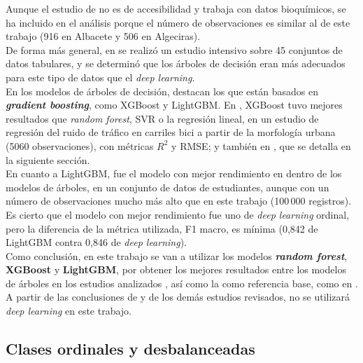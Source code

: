 Aunque el estudio de \textcite{knights2026} no es de accesibilidad y trabaja con datos bioquímicos, se ha incluido en el análisis porque el número de observaciones es similar al de este trabajo (916 en Albacete y 506 en Algeciras).
\\

De forma más general, en \textcite{grinsztajn2022} se realizó un estudio intensivo sobre 45 conjuntos de datos tabulares, y se determinó que los árboles de decisión eran más adecuados para este tipo de datos que el \textit{deep learning}.
\\

En los modelos de árboles de decisión, destacan los que están basados en \textbf{\textit{gradient boosting}}, como XGBoost y LightGBM. En \textcite{wu2026}, XGBoost tuvo mejores resultados que \textit{random forest}, \gls{SVR} o la regresión lineal, en un estudio de regresión del ruido de tráfico en carriles bici a partir de la morfología urbana (5060 observaciones), con métricas $R^2$ y \gls{RMSE}; y también en \textcite{jean2025}, que se detalla en la siguiente sección.
\\

En cuanto a LightGBM, fue el modelo con mejor rendimiento en \textcite{agal2026} dentro de los modelos de árboles, en un conjunto de datos de estudiantes, aunque con un número de observaciones mucho más alto que en este trabajo (100\,000 registros). Es cierto que el modelo con mejor rendimiento fue uno de \textit{deep learning} ordinal, pero la diferencia de la métrica utilizada, F1 macro, es mínima (0,842 de LightGBM contra 0,846 de \textit{deep learning}).
\\

Como conclusión, en este trabajo se van a utilizar los modelos \textbf{\textit{random forest}}, \textbf{XGBoost} y \textbf{LightGBM}, por obtener los mejores resultados entre los modelos de árboles en los estudios analizados \parencite{knights2026, wu2026, agal2026}, así como la \textbf{} como referencia base, como en \textcite{knights2026}. A partir de las conclusiones de \textcite{grinsztajn2022} y de los demás estudios revisados, no se utilizará \textit{deep learning} en este trabajo.
\\

\subsection{Clases ordinales y desbalanceadas}
\label{subsec:ml-ordinal}


